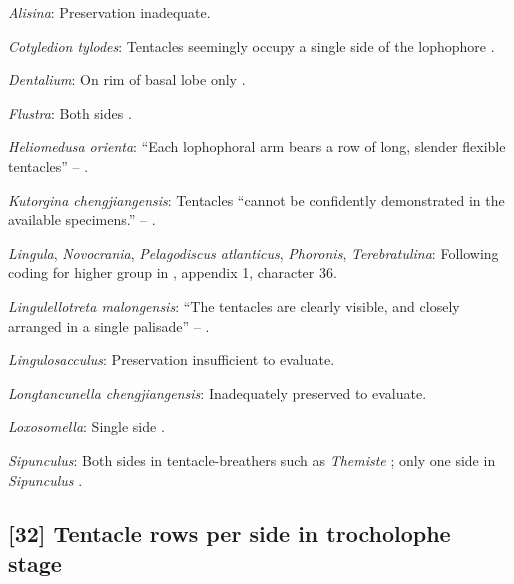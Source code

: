 \documentclass[openany]{book}
\theoremstyle{definition}
\theoremstyle{definition}
\theoremstyle{definition}
\theoremstyle{remark}
\begin{document}
\hypertarget{Alisina-coding-31}{}
\emph{Alisina}: Preservation inadequate.

\hypertarget{Cotyledion_tylodes-coding-31}{}
\emph{Cotyledion tylodes}: Tentacles seemingly occupy a single side of
the lophophore \citep{Zhang2013}.

\hypertarget{Dentalium-coding-31}{}
\emph{Dentalium}: On rim of basal lobe only \citep{Morton1959}.

\hypertarget{Flustra-coding-31}{}
\emph{Flustra}: Both sides \citep{Schwaha2015, Shunkina2015}.

\hypertarget{Heliomedusa_orienta-coding-31}{}
\emph{Heliomedusa orienta}: ``Each lophophoral arm bears a row of long,
slender flexible tentacles'' -- \citet{Zhang2009Architectureand}.

\hypertarget{Kutorgina_chengjiangensis-coding-31}{}
\emph{Kutorgina chengjiangensis}: Tentacles ``cannot be confidently
demonstrated in the available specimens.'' --
\citet{Zhang2007Rhynchonelliformeanbrachiopods}.

\hypertarget{Lingula-coding-31}{}
\emph{Lingula}, \emph{Novocrania}, \emph{Pelagodiscus atlanticus},
\emph{Phoronis}, \emph{Terebratulina}: Following coding for higher group
in \citet{Carlson1995Phylogeneticrelationships}, appendix 1, character
36.

\hypertarget{Lingulellotreta_malongensis-coding-31}{}
\emph{Lingulellotreta malongensis}: ``The tentacles are clearly visible,
and closely arranged in a single palisade'' -- \citet{Zhang2004Newdata}.

\hypertarget{Lingulosacculus-coding-31}{}
\emph{Lingulosacculus}: Preservation insufficient to evaluate.

\hypertarget{Longtancunella_chengjiangensis-coding-31}{}
\emph{Longtancunella chengjiangensis}: Inadequately preserved to
evaluate.

\hypertarget{Loxosomella-coding-31}{}
\emph{Loxosomella}: Single side \citep{Nielsen1966}.

\hypertarget{Sipunculus-coding-31}{}
\emph{Sipunculus}: Both sides in tentacle-breathers such as
\emph{Themiste} \citep{Ruppert1995, Adrianov2006}; only one side in
\emph{Sipunculus} \citep{Ruppert1995, Adrianov2006}.

\subsection*{{[}32{]} Tentacle rows per side in trocholophe
stage}\label{tentacle-rows-per-side-in-trocholophe-stage}
\end{document}
